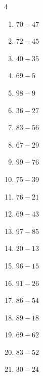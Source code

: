 \begin{multicols}{4}
\begin{enumerate}
  \item $70-47$
        \phantom{$=23$}

  \item $72-45$
        \phantom{$=27$}

  \item $40-35$
        \phantom{$=5$}

  \item $69-5$
        \phantom{$=64$}

  \item $98-9$
        \phantom{$=89$}

  \item $36-27$
        \phantom{$=9$}

  \item $83-56$
        \phantom{$=27$}

  \item $67-29$
        \phantom{$=38$}

  \item $99-76$
        \phantom{$=23$}

  \item $75-39$
        \phantom{$=36$}

  \item $76-21$
        \phantom{$=55$}

  \item $69-43$
        \phantom{$=26$}

  \item $97-85$
        \phantom{$=12$}

\columnbreak %

\resetques

  \item $20-13$
        \phantom{$=7$}

  \item $96-15$
        \phantom{$=81$}

  \item $91-26$
        \phantom{$=65$}

  \item $86-54$
        \phantom{$=32$}

  \item $89-18$
        \phantom{$=71$}

  \item $69-62$
        \phantom{$=7$}

  \item $83-52$
        \phantom{$=31$}

  \item $30-24$
        \phantom{$=6$}


\end{enumerate}
\end{multicols}
